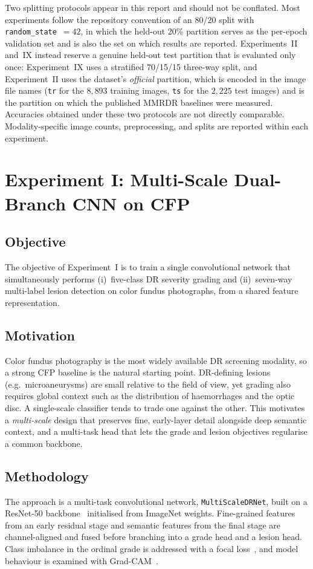 \documentclass[journal,twoside,web]{ieeecolor}
\begin{document}
Two splitting protocols appear in this report and should not be conflated. Most
experiments follow the repository convention of an 80/20 split with
\texttt{random\_state}~$=42$, in which the held-out 20\% partition serves as the
per-epoch validation set and is also the set on which results are reported.
Experiments~II and~IX instead reserve a genuine held-out test partition that is
evaluated only once: Experiment~IX uses a stratified 70/15/15 three-way split, and
Experiment~II uses the dataset's \emph{official} partition, which is encoded in the
image file names (\texttt{tr} for the $8{,}893$ training images, \texttt{ts} for the
$2{,}225$ test images) and is the partition on which the published MMRDR baselines
were measured. Accuracies obtained under these two protocols are not directly
comparable. Modality-specific image counts, preprocessing, and splits are reported
within each experiment.

\section{Experiment I: Multi-Scale Dual-Branch CNN on CFP}
\label{sec:exp1}

\subsection{Objective}
The objective of Experiment~I is to train a single convolutional network that
simultaneously performs (i)~five-class DR severity grading and (ii)~seven-way
multi-label lesion detection on color fundus photographs, from a shared feature
representation.

\subsection{Motivation}
Color fundus photography is the most widely available DR screening modality, so a
strong CFP baseline is the natural starting point. DR-defining lesions
(e.g.\ microaneurysms) are small relative to the field of view, yet grading also
requires global context such as the distribution of haemorrhages and the optic
disc. A single-scale classifier tends to trade one against the other. This
motivates a \emph{multi-scale} design that preserves fine, early-layer detail
alongside deep semantic context, and a multi-task head that lets the grade and
lesion objectives regularise a common backbone.

\subsection{Methodology}
The approach is a multi-task convolutional network, \texttt{MultiScaleDRNet},
built on a ResNet-50 backbone~\cite{resnet} initialised from ImageNet weights.
Fine-grained features from an early residual stage and semantic features from the
final stage are channel-aligned and fused before branching into a grade head and
a lesion head. Class imbalance in the ordinal grade is addressed with a focal
loss~\cite{focalloss}, and model behaviour is examined with Grad-CAM~\cite{gradcam}.
\end{document}
